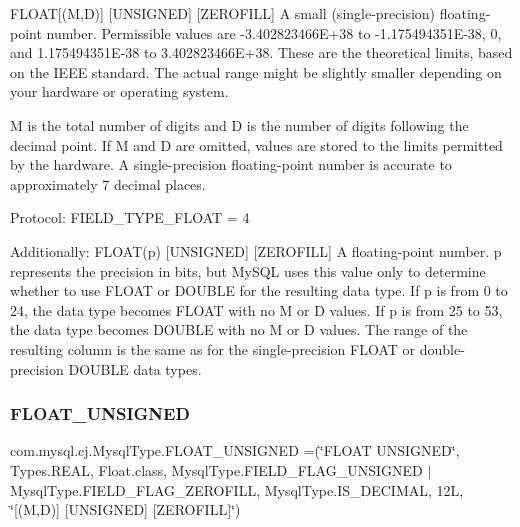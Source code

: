 F\+L\+O\+AT\mbox{[}(M,D)\mbox{]} \mbox{[}U\+N\+S\+I\+G\+N\+ED\mbox{]} \mbox{[}Z\+E\+R\+O\+F\+I\+LL\mbox{]} A small (single-\/precision) floating-\/point number. Permissible values are -\/3.\+402823466E+38 to -\/1.\+175494351E-\/38, 0, and 1.\+175494351E-\/38 to 3.\+402823466E+38. These are the theoretical limits, based on the I\+E\+EE standard. The actual range might be slightly smaller depending on your hardware or operating system.

M is the total number of digits and D is the number of digits following the decimal point. If M and D are omitted, values are stored to the limits permitted by the hardware. A single-\/precision floating-\/point number is accurate to approximately 7 decimal places.

Protocol\+: F\+I\+E\+L\+D\+\_\+\+T\+Y\+P\+E\+\_\+\+F\+L\+O\+AT = 4

Additionally\+: F\+L\+O\+A\+T(p) \mbox{[}U\+N\+S\+I\+G\+N\+ED\mbox{]} \mbox{[}Z\+E\+R\+O\+F\+I\+LL\mbox{]} A floating-\/point number. p represents the precision in bits, but My\+S\+QL uses this value only to determine whether to use F\+L\+O\+AT or D\+O\+U\+B\+LE for the resulting data type. If p is from 0 to 24, the data type becomes F\+L\+O\+AT with no M or D values. If p is from 25 to 53, the data type becomes D\+O\+U\+B\+LE with no M or D values. The range of the resulting column is the same as for the single-\/precision F\+L\+O\+AT or double-\/precision D\+O\+U\+B\+LE data types. \mbox{\label{enumcom_1_1mysql_1_1cj_1_1_mysql_type_a095a818e7723ff0543eaed09f06694fa}} 
\subsubsection{\texorpdfstring{F\+L\+O\+A\+T\+\_\+\+U\+N\+S\+I\+G\+N\+ED}{FLOAT\_UNSIGNED}}
{\footnotesize\ttfamily com.\+mysql.\+cj.\+Mysql\+Type.\+F\+L\+O\+A\+T\+\_\+\+U\+N\+S\+I\+G\+N\+ED =(\char`\"{}F\+L\+O\+AT U\+N\+S\+I\+G\+N\+ED\char`\"{}, Types.\+R\+E\+AL, Float.\+class, Mysql\+Type.\+F\+I\+E\+L\+D\+\_\+\+F\+L\+A\+G\+\_\+\+U\+N\+S\+I\+G\+N\+ED $\vert$ Mysql\+Type.\+F\+I\+E\+L\+D\+\_\+\+F\+L\+A\+G\+\_\+\+Z\+E\+R\+O\+F\+I\+LL, Mysql\+Type.\+I\+S\+\_\+\+D\+E\+C\+I\+M\+AL, 12\+L, \char`\"{}\mbox{[}(\+M,\+D)\mbox{]} \mbox{[}\+U\+N\+S\+I\+G\+N\+E\+D\mbox{]} \mbox{[}\+Z\+E\+R\+O\+F\+I\+L\+L\mbox{]}\char`\"{})}

